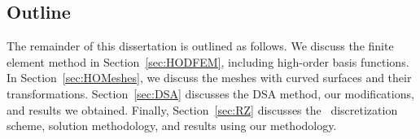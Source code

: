 \documentclass{article}
\begin{document}
\subsection{Outline}
\label{sec:OutlineIntro}

The remainder of this dissertation is outlined as follows. We discuss the finite element method in Section~\ref{sec:HODFEM}, including high-order basis functions. In Section~\ref{sec:HOMeshes}, we discuss the meshes with curved surfaces and their transformations. Section~\ref{sec:DSA} discusses the DSA method, our modifications, and results we obtained. Finally, Section~\ref{sec:RZ} discusses the \RZ\ discretization scheme, solution methodology, and results using our methodology.

%
%
\end{document}
